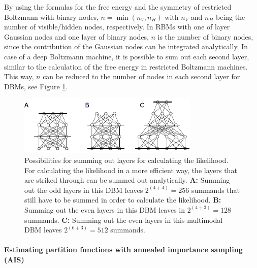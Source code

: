 \documentclass[12pt]{article}
\begin{document}
By using the formulas for the free energy and the symmetry of restricted Boltzmann with binary nodes, $n = \min(n_V, n_H)$ with $n_V$ and $n_H$ being the number of visible/hidden nodes, respectively.
In RBMs with one of layer Gaussian nodes and one layer of binary nodes, $n$ is the number of binary nodes, since the contribution of the Gaussian nodes can be integrated analytically.
In case of a deep Boltzmann machine, it is possible to sum out each second layer, similar to the calculation of the free energy in restricted Boltzmann machines. This way, $n$ can be reduced to the number of nodes in each second layer for DBMs, see Figure \ref{aissummingout}.

\begin{figure}[h!]
\centering
\includegraphics[scale=2.5]{images/AISsummingout.pdf}
\caption{Possibilities for summing out layers for calculating the likelihood. For calculating the likelihood in a more efficient way, the layers that are striked through can be summed out analytically. {\bf A:} Summing out the odd layers in this DBM leaves $2^{(4 + 4)} = 256$ summands that still have to be summed in order to calculate the likelihood. {\bf B:} Summing out the even layers in this DBM leaves in $2^{(4 + 3)} = 128$ summands. {\bf C:} Summing out the even layers in  this multimodal DBM leaves $2^{(6 + 3)} = 512$ summands.}
\label{aissummingout}
\end{figure}

\paragraph{Estimating partition functions with annealed importance sampling (AIS)}\label{methodAIS}
\end{document}
